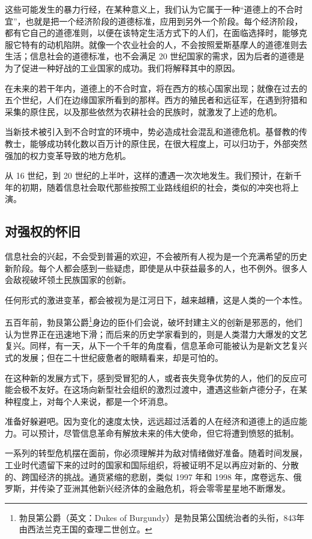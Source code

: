 这些可能发生的暴力行经，在某种意义上，我们认为它属于一种“道德上的不合时宜”，也就是把一个经济阶段的道德标准，应用到另外一个阶段。每个经济阶段，都有它自己的道德准则，以便在该特定生活方式下的人们，在面临选择时，能够克服它特有的动机陷阱。就像一个农业社会的人，不会按照爱斯基摩人的道德准则去生活；信息社会的道德标准，也不会满足 20 世纪国家的需求，因为后者的道德是为了促进一种好战的工业国家的成功。我们将解释其中的原因。


在未来的若干年内，道德上的不合时宜，将在西方的核心国家出现；就像在过去的五个世纪，人们在边缘国家所看到的那样。西方的殖民者和远征军，在遇到狩猎和采集的原住民，以及那些依然为农耕社会的民族时，就激发了上述的危机。


当新技术被引入到不合时宜的环境中，势必造成社会混乱和道德危机。基督教的传教士，能够成功转化数以百万计的原住民，在很大程度上，可以归功于，外部突然强加的权力变革导致的地方危机。


从 16 世纪，到 20 世纪的上半叶，这样的遭遇一次次地发生。我们预计，在新千年的初期，随着信息社会取代那些按照工业路线组织的社会，类似的冲突也将上演。


\subsection{对强权的怀旧}
信息社会的兴起，不会受到普遍的欢迎，不会被所有人视为是一个充满希望的历史新阶段。每个人都会感到一些疑虑，即使是从中获益最多的人，也不例外。很多人会敌视破坏领土民族国家的创新。


任何形式的激进变革，都会被视为是江河日下，越来越糟，这是人类的一个本性。


五百年前，勃艮第公爵\footnote{勃艮第公爵（英文：Dukes of Burgundy）是勃艮第公国统治者的头衔，843年由西法兰克王国的查理二世创立。}身边的臣仆们会说，破坏封建主义的创新是邪恶的，他们认为世界正在迅速地下滑；而后来的历史学家看到的，则是人类潜力大爆发的文艺复兴。同样，有一天，从下一个千年的角度看，信息革命可能被认为是新文艺复兴式的发展；但在二十世纪疲惫者的眼睛看来，却是可怕的。


在这种新的发展方式下，感到受冒犯的人，或者丧失竞争优势的人，他们的反应可能会极不友好。在这场向新型社会组织的激烈过渡中，遭遇这些新卢德分子，在某种程度上，对每个人来说，都是一个坏消息。


准备好躲避吧。因为变化的速度太快，远远超过活着的人在经济和道德上的适应能力。可以预计，尽管信息革命有解放未来的伟大使命，但它将遭到愤怒的抵制。


一系列的转型危机摆在面前，你必须理解并为敌对情绪做好准备。随着时间发展，工业时代遗留下来的过时的国家和国际组织，将被证明不足以再应对新的、分散的、跨国经济的挑战。通货紧缩的悲剧，类似 1997 年和 1998 年，席卷远东、俄罗斯，并传染了亚洲其他新兴经济体的金融危机，将会零零星星地不断爆发。


